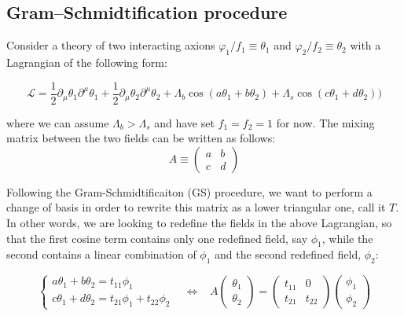 \documentclass{article}
\begin{document}
\subsection{Gram–Schmidtification procedure}
Consider a theory of two interacting axions $\varphi_1/f_1\equiv\theta_1$ and $\varphi_2/f_2\equiv\theta_2$ with a Lagrangian of the following form:

\begin{equation}
    \label{eq:pre-GS-potential}
    \mathcal{L} = \frac{1}{2}\partial_\mu\theta_1 \partial^\mu\theta_1  + \frac{1}{2}\partial_\mu\theta_2 \partial^\mu\theta_2  + \Lambda_{b}\cos{(a\theta_1+b\theta_2)}+\Lambda_{s}\cos{(c\theta_1+d\theta_2))}
\end{equation}

\noindent where we can assume $\Lambda_b>\Lambda_s$ and have set $f_1 = f_2 = 1$ for now. The mixing matrix between the two fields can be written as follows:
\begin{equation}
A \equiv
    \begin{pmatrix}
    a & b\\
    c & d
    \end{pmatrix}
\end{equation}

Following the Gram-Schmidtificaiton (GS) procedure, we want to perform a change of basis in order to rewrite this  matrix as a lower triangular one, call it $T$. In other words, we are looking to redefine the fields in the above Lagrangian, so that the first cosine term contains only one redefined field, say $\phi_1$, while the second contains a linear combination of  $\phi_1$ and the second redefined field, $\phi_2$:

\begin{equation}
    \label{eq:triang}
    \begin{cases}
        a\theta_1+b\theta_2 = t_{11} \phi_1 \\ 
        c\theta_1+d\theta_2 = t_{21} \phi_1 + t_{22} \phi_2
    \end{cases} \,\,\,\,\,
    \Leftrightarrow \,\,\,\,\,
    A \begin{pmatrix}
        \theta_1 \\
        \theta_2
    \end{pmatrix}
    = 
    \begin{pmatrix}
        t_{11} & 0 \\
        t_{21} &t_{22} 
    \end{pmatrix} 
    \begin{pmatrix}
        \phi_1 \\
        \phi_2
    \end{pmatrix}
\end{equation}
\end{document}
